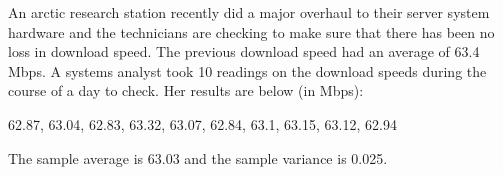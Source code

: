 \documentclass[addpoints]{examsetup}
\begin{document}
\begin{questions}
\newpage

\question
An arctic research station recently did a major overhaul to their server system hardware and the technicians are checking to make sure that there has been no loss in download speed.
The previous download speed had an average of 63.4 Mbps.
A systems analyst took 10 readings on the download speeds during the course of a day to check. 
Her results are below (in Mbps):


\begin{center}
62.87, 63.04, 62.83, 63.32, 63.07, 62.84, 63.1, 63.15, 63.12, 62.94
\end{center}


The sample average is 63.03 and the sample variance is 0.025.



\newpage\null\thispagestyle{empty}\newpage

\end{questions}
\end{document}
